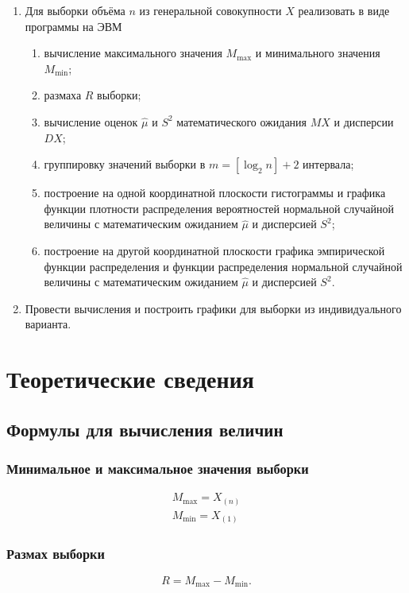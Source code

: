 \documentclass[12pt]{report}
\begin{document}
\begin{enumerate}
	\item Для выборки объёма $n$ из генеральной совокупности $X$ реализовать в виде программы на ЭВМ
	\begin{enumerate}
		\item вычисление максимального значения $M_{\max}$ и минимального значения $M_{\min}$;
		\item размаха $R$ выборки;
		\item вычисление оценок $\hat\mu$ и $S^2$ математического ожидания $MX$ и дисперсии $DX$;
		\item группировку значений выборки в $m = [\log_2 n] + 2$ интервала;
		\item построение на одной координатной плоскости гистограммы и графика функции плотности распределения вероятностей нормальной случайной величины с математическим ожиданием $\hat{\mu}$ и дисперсией $S^2$;
		\item построение на другой координатной плоскости графика эмпирической функции распределения и функции распределения нормальной случайной величины с математическим ожиданием $\hat{\mu}$ и дисперсией $S^2$.
	\end{enumerate}
	\item Провести вычисления и построить графики для выборки из индивидуального варианта.
\end{enumerate}

\chapter*{Теоретические сведения}

\section*{Формулы для вычисления величин}

\subsection*{Минимальное и максимальное значения выборки}
\begin{equation}
	\begin{aligned}
		M_{\max} = X_{(n)}\\
		M_{\min} = X_{(1)}
	\end{aligned}
\end{equation}

\subsection*{Размах выборки}
\begin{equation}
	R = M_{\max} - M_{\min}.
\end{equation}
\end{document}
